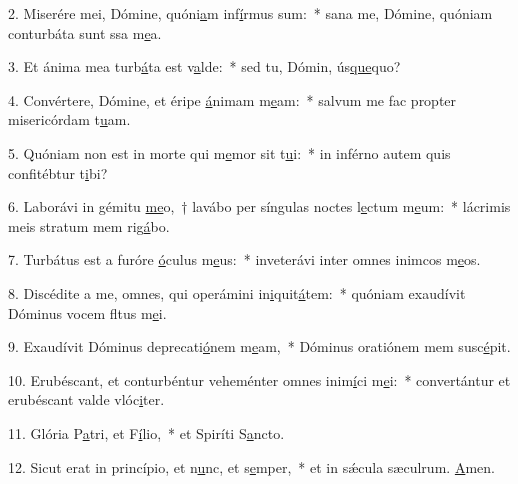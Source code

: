 2. Miserére mei, Dómine, quóni\uline{a}m inf\uline{í}rmus sum:~* sana me, Dómine, quóniam conturbáta sunt ssa m\uline{e}a.\par 
3. Et ánima mea turb\uline{á}ta est v\uline{a}lde:~* sed tu, Dómin, ús\uline{que}quo?\par 
4. Convértere, Dómine, et éripe \uline{á}nimam m\uline{e}am:~* salvum me fac propter misericórdam t\uline{u}am.\par 
5. Quóniam non est in morte qui m\uline{e}mor sit t\uline{u}i:~* in inférno autem quis confitébtur t\uline{i}bi?\par 
6. Laborávi in gémitu \uline{me}o,~† lavábo per síngulas noctes l\uline{e}ctum m\uline{e}um:~* lácrimis meis stratum mem rig\uline{á}bo.\par 
7. Turbátus est a furóre \uline{ó}culus m\uline{e}us:~* inveterávi inter omnes inimcos m\uline{e}os.\par 
8. Discédite a me, omnes, qui operámini in\uline{i}quit\uline{á}tem:~* quóniam exaudívit Dóminus vocem fltus m\uline{e}i.\par 
9. Exaudívit Dóminus deprecati\uline{ó}nem m\uline{e}am,~* Dóminus oratiónem mem susc\uline{é}pit.\par 
10. Erubéscant, et conturbéntur veheménter omnes inim\uline{í}ci m\uline{e}i:~* convertántur et erubéscant valde vlóc\uline{i}ter.\par 
11. Glória P\uline{a}tri, et F\uline{í}lio,~* et Spiríti S\uline{a}ncto.\par 
12. Sicut erat in princípio, et n\uline{u}nc, et s\uline{e}mper,~* et in sǽcula sæculrum. \uline{A}men.\par 
